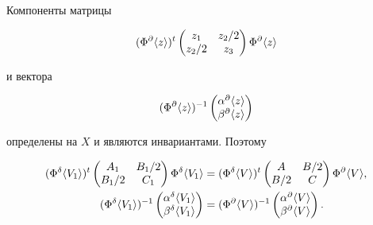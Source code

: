 Компоненты матрицы


$$ 


(\Phi^\partial\la z \ra)^t 


\begin{pmatrix} 


z_1 & z_2/2 \\ z_2/2 & z_3 


\end{pmatrix} 


\Phi^\partial\la z \ra 


$$ 


и вектора 


$$ 


(\Phi^\partial\la z \ra)^{-1} 


\begin{pmatrix} 


\alpha^\partial\la z \ra \\ 


\beta^\partial\la z \ra 


\end{pmatrix} 


$$ 


определены на $X$ и являются инвариантами. Поэтому


\begin{align*} 


(\Phi^\delta\la V_1 \ra)^t 


\begin{pmatrix} 


A_1 & B_1/2 \\ B_1/2 & C_1 


\end{pmatrix} 


\Phi^\delta\la V_1 \ra&= 


(\Phi^\delta\la V \ra)^t 


\begin{pmatrix} 


A & B/2 \\ B/2 & C 


\end{pmatrix} 


\Phi^\partial\la V \ra, 


\\ 


% 


(\Phi^\delta\la V_1 \ra)^{-1} 


\begin{pmatrix} 


\alpha^\delta\la V_1 \ra \\ \beta^\delta \la V_1 \ra 


\end{pmatrix} 


&= 


(\Phi^\partial\la V \ra)^{-1} 


\begin{pmatrix} 


\alpha^\partial\la V \ra \\ \beta^\partial \la V \ra 


\end{pmatrix} 


. 


\end{align*} 


